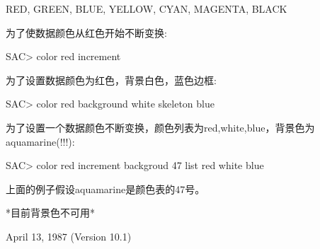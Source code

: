 RED, GREEN, BLUE, YELLOW, CYAN, MAGENTA, BLACK

为了使数据颜色从红色开始不断变换:
\begin{SACCode}
SAC> color red increment
\end{SACCode}
为了设置数据颜色为红色，背景白色，蓝色边框:
\begin{SACCode}
SAC> color red background white skeleton blue
\end{SACCode}
为了设置一个数据颜色不断变换，颜色列表为red,white,blue，背景色为aquamarine(!!!):
\begin{SACCode}
SAC> color red increment backgroud 47 list red white blue
\end{SACCode}
上面的例子假设aquamarine是颜色表的47号。

*目前背景色不可用*

April 13, 1987 (Version 10.1)
